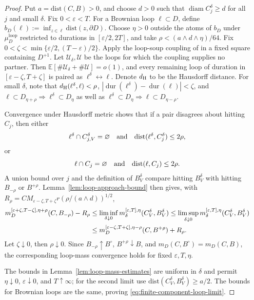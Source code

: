 \documentclass[11pt]{article}
\numberwithin{equation}{section}
\newcommand{\E}{\mathbb{E}}
\newcommand{\1}{\mathbf{1}}
\newcommand{\dist}{\mathrm{dist}}
\newcommand{\diam}{\operatorname{diam}}
\begin{document}
\begin{proof}
Put \(a=\dist(C,B)>0\), and choose \(d>0\) such that
\(\diam C_j^\delta\geq d\) for all \(j\) and small \(\delta\).
Fix \(0<\varepsilon<T\).  For a Brownian loop \(\ell\subset D\), define $b_D(\ell):=\inf_{z\in\ell}\dist(z,\partial D)$.
Choose \(\eta>0\) outside the atoms of \(b_D\) under
\(\mu_D^{\mathrm{loop}}\) restricted to durations in \([\varepsilon/2,2T]\), and take \(\rho<(a\wedge d\wedge\eta)/64\).  Fix
\(0<\zeta<\min\{\varepsilon/2,(T-\varepsilon)/2\}\).  Apply the loop-soup
coupling of \cite[Theorem~1.1 and Corollary~5.4]{LawlerTrujillo2007} in a
fixed square containing \(D^{+1}\).  Let
\(\mathcal U_\delta,\mathcal U\) be the loops for which the coupling
supplies no partner.  Then $\E[\#\mathcal U_\delta+\#\mathcal U]=o(1)$,
and every remaining loop of duration in \([\varepsilon-\zeta,T+\zeta]\) is
paired as \(\ell^\delta\leftrightarrow\ell\).  Denote $d_{\rm H}$ to be the Hausdorff distance. For small \(\delta\), note that $d_{\rm H}(\ell^\delta,\ell)<\rho$, $|\operatorname{dur}(\ell^\delta)-\operatorname{dur}(\ell)|<\zeta$,
and $\ell\subset D_{\eta+\rho}\Longrightarrow\ell^\delta\subset D_\eta$ as well as $\ell^\delta\subset D_\eta\Longrightarrow\ell\subset D_{\eta-\rho}$.

Convergence under Hausdorff metric shows that if a pair disagrees about
hitting \(C_j\), then either
\[
 \ell^\delta\cap C_{j,V}^\delta=\varnothing
 \quad\hbox{and}\quad
 \dist(\ell^\delta,C_j^\delta)\leq2\rho,
\]
or
\[
 \ell\cap C_j=\varnothing
 \quad\hbox{and}\quad
 \dist(\ell,C_j)\leq2\rho.
\]
A union bound over \(j\) and the definition of \(B_V^\delta\) compare
hitting \(B_V^\delta\) with hitting \(B_{-\rho}\) or \(B^{+\rho}\).
Lemma~\ref{lem:loop-approach-bound} then gives, with
\(R_\rho=CM_{\varepsilon-\zeta,T+\zeta}
r(\rho/(a\wedge d))^{1/2}\),
\begin{align}
m_D^{[\varepsilon+\zeta,T-\zeta],\eta+\rho}
 (C,B_{-\rho})-R_\rho &\leq\liminf_{\delta\downarrow0}
 m_\delta^{[\varepsilon,T],\eta}(C_V^\delta,B_V^\delta)
 \leq\limsup_{\delta\downarrow0}
 m_\delta^{[\varepsilon,T],\eta}(C_V^\delta,B_V^\delta)\notag\\
&\leq
 m_D^{[\varepsilon-\zeta,T+\zeta],\eta-\rho}
 (C,B^{+\rho})+R_\rho .
\end{align}
Let \(\zeta\downarrow0\), then \(\rho\downarrow0\).  Since \(B_{-\rho}\uparrow B^\circ\),
\(B^{+\rho}\downarrow B\), and
\(m_D(C,B^\circ)=m_D(C,B)\), the corresponding loop-mass convergence holds for fixed
\(\varepsilon,T,\eta\).

The bounds in Lemma~\ref{lem:loop-mass-estimates} are uniform in \(\delta\) and permit
\(\eta\downarrow0\), \(\varepsilon\downarrow0\), and \(T\uparrow\infty\);
for the second limit use \(\dist(C_V^\delta,B_V^\delta)\geq a/2\).  The bounds for Brownian loops are the same,
proving \eqref{eq:finite-component-loop-limit}.
\end{proof}
\end{document}
